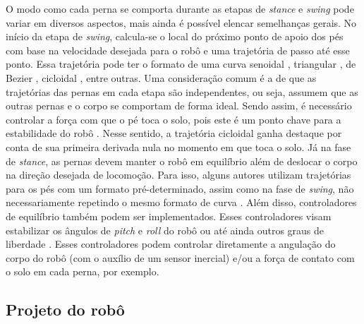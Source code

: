 \documentclass[../main.tex]{subfiles}
\begin{document}
  O modo como cada perna se comporta durante as etapas de \textit{stance} e \textit{swing} pode variar em diversos aspectos, mais ainda é possível elencar semelhanças gerais. No início da etapa de \textit{swing}, calcula-se o local do próximo ponto de apoio dos pés com base na velocidade desejada para o robô e uma trajetória de passo até esse ponto. Essa trajetória pode ter o formato de uma curva senoidal \cite{X.118}, triangular \cite{StanfordPupper}, de Bezier \cite{HackadayQuadruped}, cicloidal \cite{Shi2021} \cite{X.58}, entre outras. Uma consideração comum é a de que as trajetórias das pernas em cada etapa são independentes, ou seja, assumem que as outras pernas e o corpo se comportam de forma ideal. Sendo assim, é necessário controlar a força com que o pé toca o solo, pois este é um ponto chave para a estabilidade do robô \cite{X.118}. Nesse sentido, a trajetória cicloidal ganha destaque por conta de sua primeira derivada nula no momento em que toca o solo. Já na fase de \textit{stance}, as pernas devem manter o robô em equilíbrio além de deslocar o corpo na direção desejada de locomoção. Para isso, alguns autores utilizam trajetórias para os pés com um formato pré-determinado, assim como na fase de \textit{swing}, não necessariamente repetindo o mesmo formato de curva \cite{X.118} \cite{X.58}. Além disso, controladores de equilíbrio também podem ser implementados. Esses controladores visam estabilizar os ângulos de \textit{pitch} e \textit{roll} do robô \cite{Shi2021} \cite{HackadayQuadruped} \cite{StanfordPupper} \cite{Notspot} ou até ainda outros graus de liberdade \cite{Chen2020140736} \cite{X.134} \cite{Zhang2016284}. Esses controladores podem controlar diretamente a angulação do corpo do robô (com o auxílio de um sensor inercial) e/ou a força de contato com o solo em cada perna, por exemplo.

  \subsection{Projeto do robô}
\end{document}
